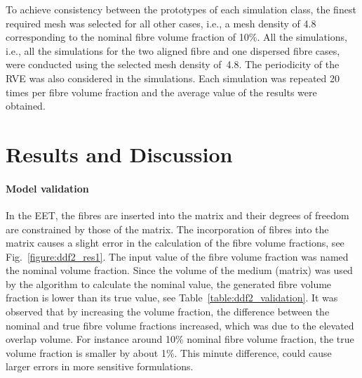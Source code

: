 	
	To achieve consistency between the prototypes of each simulation class, the finest required mesh was selected for all other cases, i.e., a mesh density of 4.8 corresponding to the nominal fibre volume fraction of 10\%. All the simulations, i.e., all the simulations for the two aligned fibre and one dispersed fibre cases, were conducted using the selected mesh density of~4.8. The periodicity of the RVE was also considered in the simulations. Each simulation was repeated 20 times per fibre volume fraction and the average value of the results were obtained.	
	

\section{Results and Discussion}
\red 
%

	\paragraph{Model validation} In the EET, the fibres are inserted into the matrix and their degrees of freedom are constrained by those of the matrix. The incorporation of fibres into the matrix causes a slight error in the calculation of the fibre volume fractions, see Fig.~\ref{figure:ddf2_res1}. The input value of the fibre volume fraction was named the nominal volume fraction. Since the volume of the medium (matrix) was used by the algorithm to calculate the nominal value, the generated fibre volume fraction is lower than its true value, see Table~\ref{table:ddf2_validation}. It was observed that by increasing the volume fraction, the difference between the nominal and true fibre volume fractions increased, which was due to the elevated overlap volume. For instance around 10\% nominal fibre volume fraction, the true volume fraction is smaller by about 1\%. This minute difference, could cause larger errors in more sensitive formulations. 

